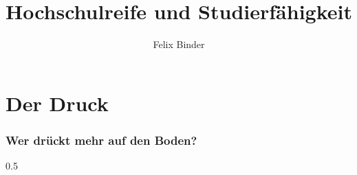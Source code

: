\documentclass{beamer}%
\title{Hochschulreife und Studierfähigkeit}
\author[Felix Binder]{Felix Binder}
\begin{document}

\section{Der Druck}
\begin{frame}
	\frametitle{Wer drückt mehr auf den Boden?}
	{0.5}%
	{%
	\begin{center}%
	\end{center}%
	}%

	\pause


\end{frame}
\end{document}
